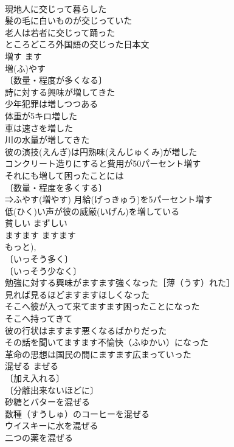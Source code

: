 \documentclass[8pt]{extreport}
\begin{document}
\begin{CJK}{UTF8}{min}
\\	現地人に交じって暮らした 
\\	髪の毛に白いものが交じっていた 
\\	老人は若者に交じって踊った 
\\	ところどころ外国語の交じった日本文 
\\	増す	ます	
\\	増(ふ)やす 
\\	〔数量・程度が多くなる〕
\\	詩に対する興味が増してきた 
\\	少年犯罪は増しつつある 
\\	体重が5キロ増した 
\\	車は速さを増した 
\\	川の水量が増してきた 
\\	彼の演技(えんぎ)は円熟味(えんじゅくみ)が増した 
\\	コンクリート造りにすると費用が50パーセント増す 
\\	それにも増して困ったことには 
\\	〔数量・程度を多くする〕
\\	⇒ふやす(増やす) 月給(げっきゅう)を5パーセント増す 
\\	低(ひく)い声が彼の威厳(いげん)を増している 
\\	貧しい	まずしい	
\\	ますます	ますます	
\\	もっと), 
\\	〔いっそう多く〕
\\	〔いっそう少なく〕
\\	勉強に対する興味がますます強くなった［薄（うす）れた］ 
\\	見れば見るほどますますほしくなった 
\\	そこへ彼が入って来てますます困ったことになった 
\\	そこへ持ってきて 
\\	彼の行状はますます悪くなるばかりだった 
\\	その話を聞いてますます不愉快（ふゆかい）になった 
\\	革命の思想は国民の間にますます広まっていった 
\\	混ぜる	まぜる	
\\	〔加え入れる〕
\\	〔分離出来ないほどに〕
\\	砂糖とバターを混ぜる 
\\	数種（すうしゅ）のコーヒーを混ぜる 
\\	ウイスキーに水を混ぜる 
\\	二つの薬を混ぜる 

\end{CJK}
\end{document}
